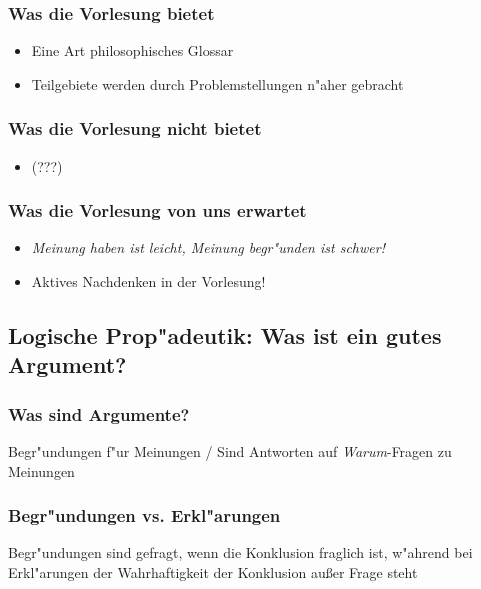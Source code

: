 \documentclass[emulatestandardclasses]{scrartcl}
\begin{document}
\subsubsection{Was die Vorlesung bietet}

\begin{itemize}
  \item Eine Art philosophisches Glossar
  \item Teilgebiete werden durch Problemstellungen n"aher gebracht
\end{itemize}


\subsubsection{Was die Vorlesung nicht bietet}

\begin{itemize}
  \item {\color{red}(???)}
\end{itemize}

\subsubsection{Was die Vorlesung von uns erwartet}

\begin{itemize}
  \item \emph{Meinung haben ist leicht, Meinung begr"unden ist schwer!}
  \item Aktives Nachdenken in der Vorlesung!
\end{itemize}

\subsection{Logische Prop"adeutik: Was ist ein gutes Argument?}

\subsubsection{Was sind Argumente?}

Begr"undungen f"ur Meinungen / Sind Antworten auf \emph{Warum}-Fragen zu Meinungen

\subsubsection{Begr"undungen vs. Erkl"arungen}

Begr"undungen sind gefragt, wenn die Konklusion fraglich ist, w"ahrend bei Erkl"arungen der Wahrhaftigkeit der Konklusion außer Frage steht
\end{document}
